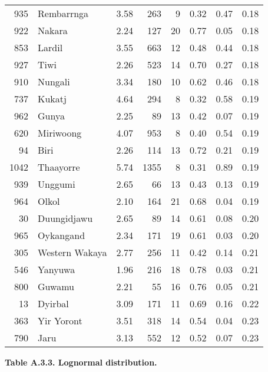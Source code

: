 \begin{longtable}[]{@{}rlrrrrrr@{}}
935 & Rembarrnga & 3.58 & 263 & 9 & 0.32 & 0.47 & 0.18\tabularnewline
922 & Nakara & 2.24 & 127 & 20 & 0.77 & 0.05 & 0.18\tabularnewline
853 & Lardil & 3.55 & 663 & 12 & 0.48 & 0.44 & 0.18\tabularnewline
927 & Tiwi & 2.26 & 523 & 14 & 0.70 & 0.27 & 0.18\tabularnewline
910 & Nungali & 3.34 & 180 & 10 & 0.62 & 0.46 & 0.18\tabularnewline
737 & Kukatj & 4.64 & 294 & 8 & 0.32 & 0.58 & 0.19\tabularnewline
962 & Gunya & 2.25 & 89 & 13 & 0.42 & 0.07 & 0.19\tabularnewline
620 & Miriwoong & 4.07 & 953 & 8 & 0.40 & 0.54 & 0.19\tabularnewline
94 & Biri & 2.26 & 114 & 13 & 0.72 & 0.21 & 0.19\tabularnewline
1042 & Thaayorre & 5.74 & 1355 & 8 & 0.31 & 0.89 & 0.19\tabularnewline
939 & Unggumi & 2.65 & 66 & 13 & 0.43 & 0.13 & 0.19\tabularnewline
964 & Olkol & 2.10 & 164 & 21 & 0.68 & 0.04 & 0.19\tabularnewline
30 & Duungidjawu & 2.65 & 89 & 14 & 0.61 & 0.08 & 0.20\tabularnewline
965 & Oykangand & 2.34 & 171 & 19 & 0.61 & 0.03 & 0.20\tabularnewline
305 & Western Wakaya & 2.77 & 256 & 11 & 0.42 & 0.14 &
0.21\tabularnewline
546 & Yanyuwa & 1.96 & 216 & 18 & 0.78 & 0.03 & 0.21\tabularnewline
800 & Guwamu & 2.21 & 55 & 16 & 0.76 & 0.05 & 0.21\tabularnewline
13 & Dyirbal & 3.09 & 171 & 11 & 0.69 & 0.16 & 0.22\tabularnewline
363 & Yir Yoront & 3.51 & 318 & 14 & 0.54 & 0.04 & 0.23\tabularnewline
790 & Jaru & 3.13 & 552 & 12 & 0.52 & 0.07 & 0.23\tabularnewline
\bottomrule
\end{longtable}

\newpage

\textbf{Table A.3.3. Lognormal distribution.}


